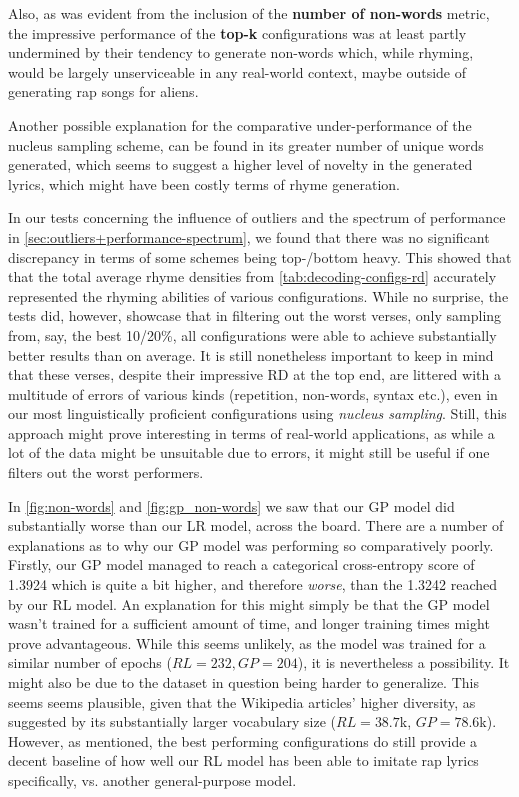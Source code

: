 Also, as was evident from the inclusion of the \textbf{number of non-words} metric, the impressive performance of the \textbf{top-k} configurations was at least partly undermined by their tendency to generate non-words which, while rhyming, would be largely unserviceable
in any real-world context, maybe outside of generating rap songs for aliens.

Another possible explanation for the comparative under-performance of the nucleus sampling scheme, can be found in its greater number of unique words generated, which seems to suggest a higher level of novelty in the generated lyrics, which might have been costly terms of rhyme generation.

In our tests concerning the influence of outliers and the spectrum of performance in \cref{sec:outliers+performance-spectrum}, we found that there was no significant discrepancy in terms of some schemes being top-/bottom heavy. This showed that that the total average rhyme densities from \cref{tab:decoding-configs-rd} accurately represented the rhyming abilities of various configurations. While no surprise, the tests did, however, showcase that in filtering out the worst verses, only sampling from, say, the best 10/20\%, all configurations were able to achieve substantially better results than on average. It is still nonetheless important to keep in mind that these verses, despite their impressive RD at the top end, are littered with a multitude of errors of various kinds (repetition, non-words, syntax etc.), even in our most linguistically proficient configurations using \textit{nucleus sampling}. Still, this approach might prove interesting in terms of real-world applications, as while a lot of the data might be unsuitable due to errors, it might still be useful if one filters out the worst performers.

In \cref{fig:non-words} and \cref{fig:gp_non-words} we saw that our GP model did substantially worse than our LR model, across the board. There are a number of explanations as to why our GP model was performing so comparatively poorly. Firstly, our GP model managed to reach a categorical cross-entropy score of 1.3924 which is quite a bit higher, and therefore \textit{worse}, than the 1.3242 reached by our RL model. An explanation for this might simply be that the GP model wasn't trained for a sufficient amount of time, and longer training times might prove advantageous. While this seems unlikely, as the model was trained for a similar number of epochs ($RL=232, GP=204$), it is nevertheless a possibility. It might also be due to the dataset in question being harder to generalize. This seems seems plausible, given that the Wikipedia articles' higher diversity, as suggested by its substantially larger vocabulary size ($RL=38.7$k, $GP=78.6$k). However, as mentioned, the best performing configurations do still provide a decent baseline of how well our RL model has been able to imitate rap lyrics specifically, vs. another general-purpose model.

